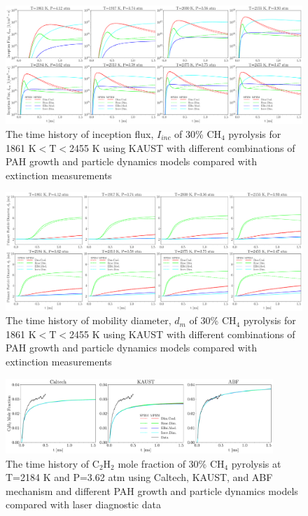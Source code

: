 \begin{figure}[H]
	\centering
	\includegraphics[width=1\textwidth]{Figures/Results/Shocktube/Stanford/june/30CH4_sootIinc_kaust.pdf}
	\caption{The time history of inception flux, $I_{inc}$ of 30\% $\mathrm{CH_4}$ pyrolysis for 1861 K$<\mathrm{T}<$2455 K using KAUST with different combinations of PAH growth and particle dynamics models compared with extinction measurements}
	\label{fig:shocktubest_30ch4_Iinc_kaust} 
\end{figure}

\begin{figure}[H]
	\centering
	\includegraphics[width=1\textwidth]{Figures/Results/Shocktube/Stanford/june/30CH4_sootdp_kaust.pdf}
	\caption{The time history of mobility diameter, $d_m$ of 30\% $\mathrm{CH_4}$ pyrolysis for 1861 K$<\mathrm{T}<$2455 K using KAUST with different combinations of PAH growth and particle dynamics models compared with extinction measurements}
	\label{fig:shocktubest_30ch4_dm_kaust} 
\end{figure}


\begin{figure}[H]
	\centering
	\includegraphics[width=0.9\textwidth]{Figures/Results/Shocktube/Stanford/june/stsh_mech_compare_C2H2.pdf}
	\caption{The time history of $\mathrm{C_2H_2}$ mole fraction of 30\% $\mathrm{CH_4}$ pyrolysis at T=2184 K and P=3.62 atm using Caltech, KAUST, and ABF mechanism and different PAH growth and particle dynamics models  compared with laser diagnostic data}
	\label{fig:shocktubestc2h2} 
\end{figure}

